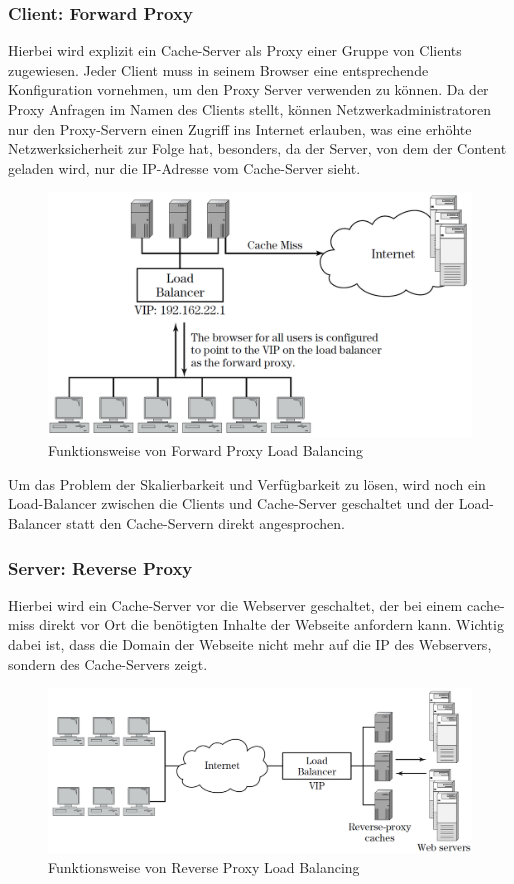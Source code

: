 \subsubsection{Client: Forward Proxy}
\label{sec:Client: Forward Proxy}
Hierbei wird explizit ein Cache-Server als Proxy einer Gruppe von Clients zugewiesen. Jeder Client muss in seinem Browser eine entsprechende Konfiguration vornehmen, um den Proxy Server verwenden zu können. Da der Proxy Anfragen im Namen des Clients stellt, können Netzwerkadministratoren nur den Proxy-Servern einen Zugriff ins Internet erlauben, was eine erhöhte Netzwerksicherheit zur Folge hat, besonders, da der Server, von dem der Content geladen wird, nur die IP-Adresse vom Cache-Server sieht.

\begin{figure}[!h]
	\begin{center}
		\includegraphics[width=0.5\linewidth]{images/Forward_Proxy.png}
		\caption{Funktionsweise von Forward Proxy Load Balancing \cite{LoadBalancing2}}
		\label{Forward_Proxy_Load_Balancing}
	\end{center}
\end{figure}

Um das Problem der Skalierbarkeit und Verfügbarkeit zu lösen, wird noch ein Load-Balancer zwischen die Clients und Cache-Server geschaltet und der Load-Balancer statt den Cache-Servern direkt angesprochen.
\cite{LoadBalancing2}

\subsubsection{Server: Reverse Proxy}
\label{sec:Server: Reverse Proxy}
Hierbei wird ein Cache-Server vor die Webserver geschaltet, der bei einem cache-miss direkt vor Ort die benötigten Inhalte der Webseite anfordern kann. Wichtig dabei ist, dass die Domain der Webseite nicht mehr auf die IP des Webservers, sondern des Cache-Servers zeigt.

\begin{figure}[!h]
	\begin{center}
		\includegraphics[width=0.5\linewidth]{images/Reverse_Proxy.png}
		\caption{Funktionsweise von Reverse Proxy Load Balancing \cite{LoadBalancing2}}
		\label{Reverse_Proxy_Load_Balancing}
	\end{center}
\end{figure}

